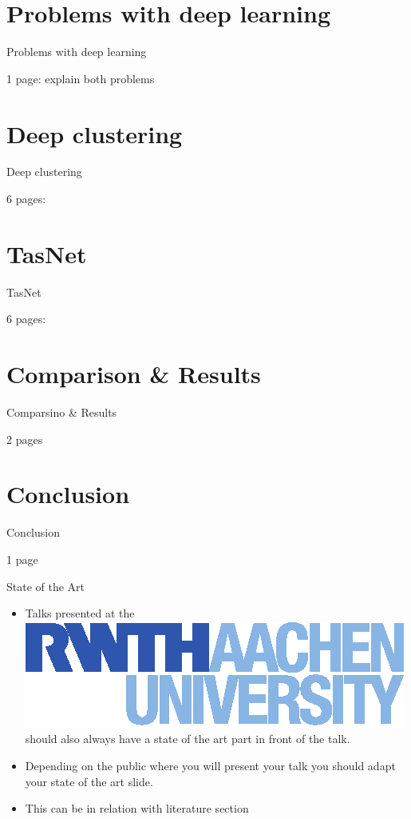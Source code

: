 \documentclass[xcolor=table,mathserif,9pt]{beamer}    %
\begin{document}
\section{Problems with deep learning}%
\label{sec:problems_with_deep_learning}
\begin{frame}{Problems with deep learning}

1 page: explain both problems
\end{frame}

\section{Deep clustering}%
\label{sec:deep_clustering}
\begin{frame}{Deep clustering}

6 pages:
\end{frame}

\section{TasNet}%
\label{sec:tasnet}
\begin{frame}{TasNet}

6 pages:
\end{frame}

\section{Comparison \& Results}%
\label{sec:results}
\begin{frame}{Comparsino \& Results}

2 pages
\end{frame}

\section{Conclusion}%
\label{sec:conclusion}
\begin{frame}{Conclusion}

1 page
\end{frame}





\begin{frame}{State of the Art}
\begin{itemize}
\item Talks presented at the
  \href{http:://www-i6.rwth-aachen.de/}{\includegraphics[height=\baselineskip]{logos/logo_hltpr_rgb_RWTH.eps}}
  should also always have a state of the art part in front of the talk.
\item Depending on the public where you will present your talk you should
adapt your state of the art slide.
\item This can be in relation with literature section
\end{itemize}
\end{frame}
\end{document}
